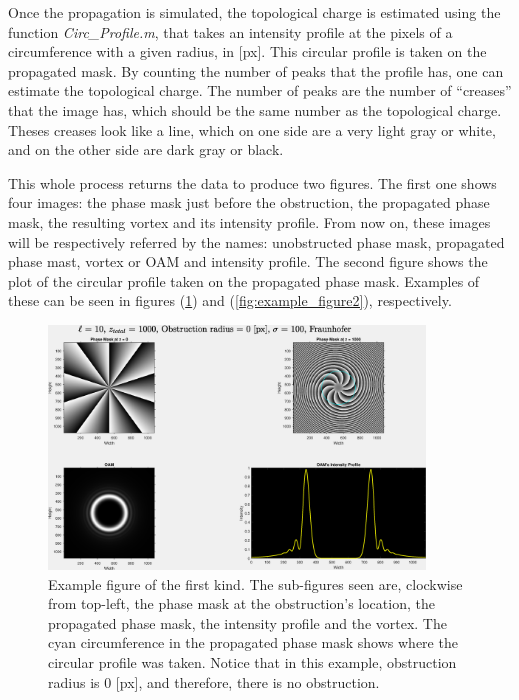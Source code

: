 Once the propagation is simulated, the topological charge is estimated using the function \textit{Circ\_Profile.m}, that takes an intensity profile at the pixels of a circumference with a given radius, in [px]. This circular profile is taken on the propagated mask. By counting the number of peaks that the profile has, one can estimate the topological charge. The number of peaks are the number of ``creases'' that the image has, which should be the same number as the topological charge. Theses creases look like a line, which on one side are a very light gray or white, and on the other side are dark gray or black.

This whole process returns the data to produce two figures. The first one shows four images: the phase mask just before the obstruction, the propagated phase mask, the resulting vortex and its intensity profile. From now on, these images will be respectively referred by the names: unobstructed phase mask, propagated phase mast, vortex or OAM and intensity profile. The second figure shows the plot of the circular profile taken on the propagated phase mask. Examples of these can be seen in figures (\ref{fig:example_figure1}) and (\ref{fig:example_figure2}), respectively.

\begin{figure}[htbp]
    \centering
    \includegraphics[width=10cm]{images/c03/Example_Result.eps}
    \caption{Example figure of the first kind. The sub-figures seen are, clockwise from top-left, the phase mask at the obstruction's location, the propagated phase mask, the intensity profile and the vortex. The cyan circumference in the propagated phase mask shows where the circular profile was taken. Notice that in this example, obstruction radius is 0 [px], and therefore, there is no obstruction.}
    \label{fig:example_figure1}
\end{figure}

